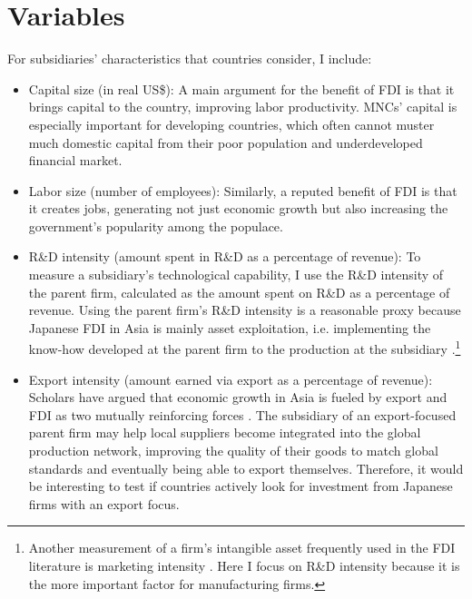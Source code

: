 \section{Variables}

For subsidiaries' characteristics that countries consider, I include:

\begin{itemize}
\item Capital size (in real US\$): A main argument for the benefit of FDI is
  that it brings capital to the country, improving labor productivity. MNCs'
  capital is especially important for developing countries, which often cannot
  muster much domestic capital from their poor population and underdeveloped
  financial market.

\item Labor size (number of employees): Similarly, a reputed benefit of FDI is
  that it creates jobs, generating not just economic growth but also increasing
  the government's popularity among the populace.

\item R\&D intensity (amount spent in R\&D as a percentage of revenue): To
  measure a subsidiary's technological capability, I use the R\&D intensity of
  the parent firm, calculated as the amount spent on R\&D as a percentage of
  revenue. Using the parent firm's R\&D intensity is a reasonable proxy because
  Japanese FDI in Asia is mainly asset exploitation, i.e. implementing the
  know-how developed at the parent firm to the production at the subsidiary
  \citep{Pak2005}.\footnote{Another measurement of a firm's intangible asset
    frequently used in the FDI literature is marketing intensity
    \citep{Girma2005}. Here I focus on R\&D intensity because it is the more
    important factor for manufacturing firms.}

\item Export intensity (amount earned via export as a percentage of revenue):
  Scholars have argued that economic growth in Asia is fueled by export and FDI
  as two mutually reinforcing forces \citep{Liu2002}. The subsidiary of an
  export-focused parent firm may help local suppliers become integrated into
  the global production network, improving the quality of their goods to match
  global standards and eventually being able to export themselves. Therefore, it
  would be interesting to test if countries actively look for investment from
  Japanese firms with an export focus.
\end{itemize}


